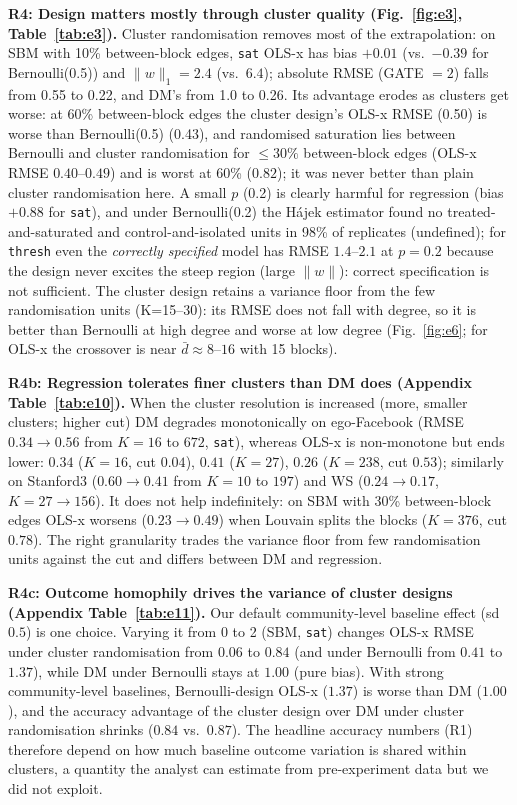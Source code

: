 \textbf{R4: Design matters mostly through cluster quality (Fig.~\ref{fig:e3}, Table~\ref{tab:e3}).} Cluster randomisation removes most of the extrapolation: on SBM with 10\% between-block edges, \texttt{sat} OLS-x has bias $+0.01$ (vs.\ $-0.39$ for Bernoulli(0.5)) and $\|w\|_1=2.4$ (vs.\ $6.4$); absolute RMSE (GATE $=2$) falls from 0.55 to 0.22, and DM's from 1.0 to 0.26. Its advantage erodes as clusters get worse: at 60\% between-block edges the cluster design's OLS-x RMSE (0.50) is worse than Bernoulli(0.5) (0.43), and randomised saturation lies between Bernoulli and cluster randomisation for $\le30\%$ between-block edges (OLS-x RMSE $0.40$--$0.49$) and is worst at 60\% ($0.82$); it was never better than plain cluster randomisation here. A small $p$ (0.2) is clearly harmful for regression (bias $+0.88$ for \texttt{sat}), and under Bernoulli(0.2) the H\'ajek estimator found no treated-and-saturated and control-and-isolated units in 98\% of replicates (undefined); for \texttt{thresh} even the \emph{correctly specified} model has RMSE $1.4$--$2.1$ at $p{=}0.2$ because the design never excites the steep region (large $\|w\|$): correct specification is not sufficient. The cluster design retains a variance floor from the few randomisation units (K=15--30): its RMSE does not fall with degree, so it is better than Bernoulli at high degree and worse at low degree (Fig.~\ref{fig:e6}; for OLS-x the crossover is near $\bar d\approx8$--$16$ with 15 blocks).



\textbf{R4b: Regression tolerates finer clusters than DM does (Appendix Table~\ref{tab:e10}).} When the cluster resolution is increased (more, smaller clusters; higher cut) DM degrades monotonically on ego-Facebook (RMSE $0.34\to0.56$ from $K{=}16$ to $672$, \texttt{sat}), whereas OLS-x is non-monotone but ends lower: $0.34$ ($K{=}16$, cut $0.04$), $0.41$ ($K{=}27$), $0.26$ ($K{=}238$, cut $0.53$); similarly on Stanford3 ($0.60\to0.41$ from $K{=}10$ to $197$) and WS ($0.24\to0.17$, $K{=}27\to156$). It does not help indefinitely: on SBM with 30\% between-block edges OLS-x worsens ($0.23\to0.49$) when Louvain splits the blocks ($K{=}376$, cut $0.78$). The right granularity trades the variance floor from few randomisation units against the cut and differs between DM and regression.

\textbf{R4c: Outcome homophily drives the variance of cluster designs (Appendix Table~\ref{tab:e11}).} Our default community-level baseline effect (sd $0.5$) is one choice. Varying it from 0 to 2 (SBM, \texttt{sat}) changes OLS-x RMSE under cluster randomisation from $0.06$ to $0.84$ (and under Bernoulli from $0.41$ to $1.37$), while DM under Bernoulli stays at $1.00$ (pure bias). With strong community-level baselines, Bernoulli-design OLS-x ($1.37$) is worse than DM ($1.00$), and the accuracy advantage of the cluster design over DM under cluster randomisation shrinks ($0.84$ vs.\ $0.87$). The headline accuracy numbers (R1) therefore depend on how much baseline outcome variation is shared within clusters, a quantity the analyst can estimate from pre-experiment data but we did not exploit.

